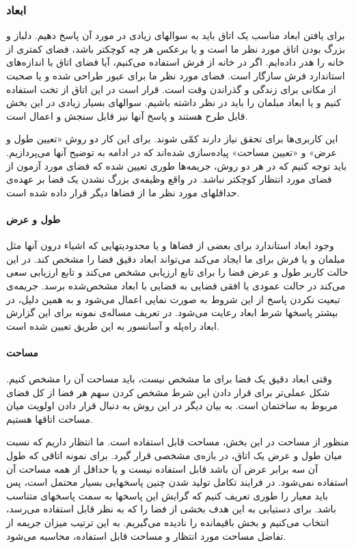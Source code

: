 \documentclass{report}
\begin{document}
\subsubsection{ابعاد}
برای یافتن ابعاد مناسب یک اتاق باید به سوالهای زیادی در مورد آن پاسخ دهیم. دلباز و بزرگ بودن اتاق مورد نظر ما است و یا برعکس هر چه کوچکتر باشد، فضای کمتری از خانه را هدر داده‌ایم. اگر در خانه از فرش استفاده می‌کنیم، آیا فضای اتاق با اندازه‌های استاندارد فرش سازگار است. فضای مورد نظر ما برای عبور طراحی شده و یا صحبت از مکانی برای زندگی و گذراندن وقت است. قرار است در این اتاق از تخت استفاده کنیم و یا ابعاد مبلمان را باید در نظر داشته باشیم. سوالهای بسیار زیادی در این بخش قابل طرح هستند و پاسخ آنها نیز قابل سنجش و اعمال است.

این کاربری‌ها برای تحقق نیاز دارند کمّی شوند. برای این کار دو روش «تعیین طول و عرض» و «تعیین مساحت» پیاده‌سازی شده‌اند که در ادامه به توضیح آنها می‌پردازیم. باید توجه کنیم که در هر دو روش، جریمه‌ها طوری تعیین شده که فضای مورد آزمون از فضای مورد انتظار کوچکتر نباشد. در واقع وظیفه‌ی بزرگ نشدن یک فضا بر عهده‌ی حداقلهای مورد نظر ما از فضاها دیگر قرار داده شده است.

\paragraph{طول و عرض}
وجود ابعاد استاندارد برای بعضی از فضاها و یا محدودیتهایی که اشیاء درون آنها مثل مبلمان و یا فرش برای ما ایجاد می‌کند می‌تواند ابعاد دقیق فضا را مشخص کند. در این حالت کاربر طول و عرض فضا را برای تابع ارزیابی مشخص می‌کند و تابع ارزیابی سعی می‌کند در حالت عمودی یا افقی فضایی به فضایی با ابعاد مشخص‌شده برسد. جریمه‌ی تبعیت نکردن پاسخ از این شروط به صورت نمایی اعمال می‌شود و به همین دلیل، در بیشتر پاسخها شرط ابعاد رعایت می‌شود. در تعریف مساله‌ی نمونه برای این گزارش ابعاد راه‌پله و آسانسور به این طریق تعیین شده است.

\paragraph{مساحت}
وقتی ابعاد دقیق یک فضا برای ما مشخص نیست، باید مساحت آن را مشخص کنیم. شکل عملی‌تر برای قرار دادن این شرط مشخص کردن سهم هر فضا از کل فضای مربوط به ساختمان است. به بیان دیگر در این روش به دنبال قرار دادن اولویت میان مساحت اتاقها هستیم.

منظور از مساحت در این بخش، مساحت قابل استفاده است. ما انتظار داریم که نسبت میان طول و عرض یک اتاق، در بازه‌ی مشخصی قرار گیرد. برای نمونه اتاقی که طول آن سه برابر عرض آن باشد قابل استفاده نیست و یا حداقل از همه مساحت آن استفاده نمی‌شود. در فرایند تکامل تولید شدن چنین پاسخهایی بسیار محتمل است، پس باید معیار را طوری تعریف کنیم که گرایش این پاسخها به سمت پاسخهای متناسب باشد. برای دستیابی به این هدف بخشی از فضا را که به نظر قابل استفاده می‌رسد، انتخاب می‌کنیم و بخش باقیمانده را نادیده می‌گیریم. به این ترتیب میزان جریمه از تفاضل مساحت مورد انتظار و مساحت قابل استفاده، محاسبه می‌شود.
\end{document}
